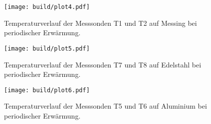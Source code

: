 \begin{figure}
    \centering
    \texttt{[image: build/plot4.pdf]}
    \caption{Temperaturverlauf der Messsonden T1 und T2 auf Messing bei periodischer Erwärmung.} 
    \label{fig:plot4}
\end{figure}


\begin{figure}
    \centering
    \texttt{[image: build/plot5.pdf]}
    \caption{Temperaturverlauf der Messsonden T7 und T8 auf Edelstahl bei periodischer Erwärmung.} 
    \label{fig:plot5}
\end{figure}


\begin{figure}
    \centering
    \texttt{[image: build/plot6.pdf]}
    \caption{Temperaturverlauf der Messsonden T5 und T6 auf Aluminium bei periodischer Erwärmung.} 
    \label{fig:plot6}
\end{figure}